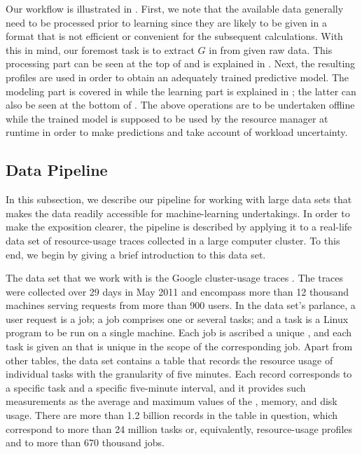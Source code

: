 Our workflow is illustrated in . First, we note that the
available data generally need to be processed prior to learning since they are
likely to be given in a format that is not efficient or convenient for the
subsequent calculations. With this in mind, our foremost task is to extract $G$
in  from given raw data. This processing part can be seen at
the top of  and is explained in . Next,
the resulting profiles are used in order to obtain an adequately trained
predictive model. The modeling part is covered in  while the
learning part is explained in ; the latter can also be seen
at the bottom of . The above operations are to be
undertaken offline while the trained model is supposed to be used by the
resource manager at runtime in order to make predictions and take account of
workload uncertainty.

\subsection{Data Pipeline}

In this subsection, we describe our pipeline for working with large data sets
that makes the data readily accessible for machine-learning undertakings. In
order to make the exposition clearer, the pipeline is described by applying it
to a real-life data set of resource-usage traces collected in a large computer
cluster. To this end, we begin by giving a brief introduction to this data set.

The data set that we work with is the Google cluster-usage traces
\cite{reiss2011}. The traces were collected over 29 days in May 2011 and
encompass more than 12 thousand machines serving requests from more than 900
users. In the data set's parlance, a user request is a job; a job comprises one
or several tasks; and a task is a Linux program to be run on a single machine.
Each job is ascribed a unique , and each task is given an  that is
unique in the scope of the corresponding job. Apart from other tables, the data
set contains a table that records the resource usage of individual tasks with
the granularity of five minutes. Each record corresponds to a specific task and
a specific five-minute interval, and it provides such measurements as the
average and maximum values of the , memory, and disk usage. There are
more than 1.2 billion records in the table in question, which correspond to more
than 24 million tasks or, equivalently, resource-usage profiles and to more than
670 thousand jobs.

